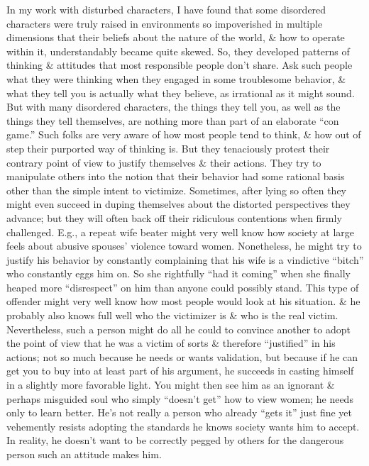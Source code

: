 \documentclass{article}
\numberwithin{equation}{section}
\begin{document}
In my work with disturbed characters, I have found that some disordered characters were truly raised in environments so impoverished in multiple dimensions that their beliefs about the nature of the world, \& how to operate within it, understandably became quite skewed. So, they developed patterns of thinking \& attitudes that most responsible people don't share. Ask such people what they were thinking when they engaged in some troublesome behavior, \& what they tell you is actually what they believe, as irrational as it might sound. But with many disordered characters, the things they tell you, as well as the things they tell themselves, are nothing more than part of an elaborate ``con game.'' Such folks are very aware of how most people tend to think, \& how out of step their purported way of thinking is. But they tenaciously protest their contrary point of view to justify themselves \& their actions. They try to manipulate others into the notion that their behavior had some rational basis other than the simple intent to victimize. Sometimes, after lying so often they might even succeed in duping themselves about the distorted perspectives they advance; but they will often back off their ridiculous contentions when firmly challenged. E.g., a repeat wife beater might very well know how society at large feels about abusive spouses' violence toward women. Nonetheless, he might try to justify his behavior by constantly complaining that his wife is a vindictive ``bitch'' who constantly eggs him on. So she rightfully ``had it coming'' when she finally heaped more ``disrespect'' on him than anyone could possibly stand. This type of offender might very well know how most people would look at his situation. \& he probably also knows full well who the victimizer is \& who is the real victim. Nevertheless, such a person might do all he could to convince another to adopt the point of view that he was a victim of sorts \& therefore ``justified'' in his actions; not so much because he needs or wants validation, but because if he can get you to buy into at least part of his argument, he succeeds in casting himself in a slightly more favorable light. You might then see him as an ignorant \& perhaps misguided soul who simply ``doesn't get'' how to view women; he needs only to learn better. He's not really a person who already ``gets it'' just fine yet vehemently resists adopting the standards he knows society wants him to accept. In reality, he doesn't want to be correctly pegged by others for the dangerous person such an attitude makes him.
\end{document}
